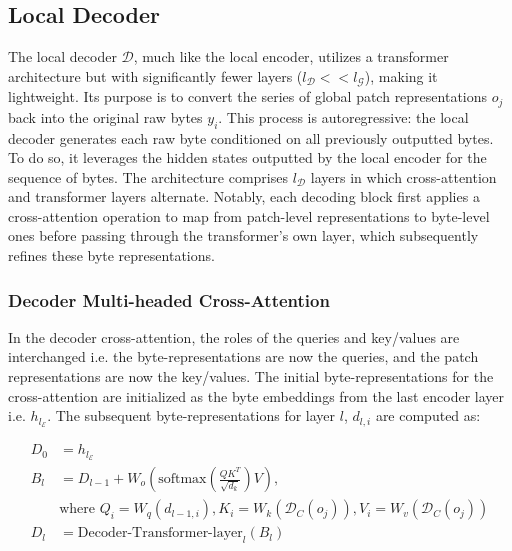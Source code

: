 \subsection{Local Decoder} 

The local decoder $\mathcal{D}$, much like the local encoder, utilizes a transformer architecture but with significantly fewer layers ($l_{\mathcal{D}} << l_{\mathcal{G}}$), making it lightweight. Its purpose is to convert the series of global patch representations $o_j$ back into the original raw bytes $y_i$. This process is autoregressive: the local decoder generates each raw byte conditioned on all previously outputted bytes. To do so, it leverages the hidden states outputted by the local encoder for the sequence of bytes. The architecture comprises $l_{\mathcal{D}}$ layers in which cross-attention and transformer layers alternate. Notably, each decoding block first applies a cross-attention operation to map from patch-level representations to byte-level ones before passing through the transformer's own layer, which subsequently refines these byte representations.

\subsubsection{Decoder Multi-headed Cross-Attention} 

In the decoder cross-attention, the roles of the queries and key/values are interchanged i.e. the byte-representations are now the queries, and the patch representations are now the key/values. The initial byte-representations for the cross-attention are initialized as the byte embeddings from the last encoder layer i.e. $h_{l_{\mathcal{E}}}$. The subsequent byte-representations for layer $l$, $d_{l,i}$ are computed as:

\begin{align}
D_0 &= h_{l_{\mathcal{E}}} \\
B_l &= D_{l-1} + W_o\left(\text{softmax}\left(\frac{QK^T}{\sqrt{d_k}}\right)V\right), \\
  &\text{where } Q_i = W_q(d_{l-1,i}), K_i = W_k(\mathcal{D}_C(o_j)), V_i = W_v(\mathcal{D}_C(o_j)) \\
  D_l &= \text{Decoder-Transformer-layer}_l(B_l)
\end{align}

